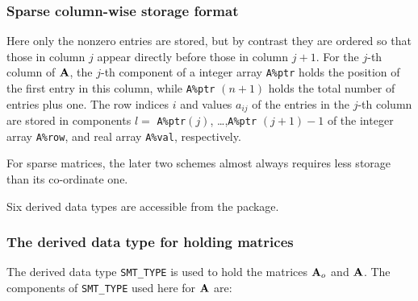 \documentclass{galahad}
\begin{document}
\subsubsection{Sparse column-wise storage format}\label{colwise}
Here only the nonzero entries are stored, but by contrast
they are ordered so that those in column $j$ appear directly before those
in column $j+1$. For the $j$-th column of ${\mathbf{A}}$, the $j$-th component of a 
integer array {\tt A\%ptr} holds the position of the first entry in this column,
while {\tt A\%ptr} $(n+1)$ holds the total number of entries plus one.
The row indices $i$ and values $a_{ij}$ of the entries in the $j$-th column
are stored in components 
$l =$ {\tt A\%ptr}$(j)$, \ldots ,{\tt A\%ptr} $(j+1)-1$ of the 
integer array {\tt A\%row}, and real array {\tt A\%val}, respectively. 

For sparse matrices, the later two schemes almost always requires less storage 
than its co-ordinate one.



\galtypes
Six derived data types are accessible from the package.


\subsubsection{The derived data type for holding matrices}\label{typesmt}
The derived data type {\tt SMT\_TYPE} is used to hold the matrices ${\mathbf{A}}_o$
and ${\mathbf{A}}$. The components of {\tt SMT\_TYPE} used here for ${\mathbf{A}}$
are:
\end{document}
